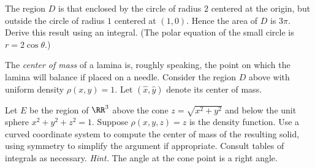 \documentclass[12pt]{exam}
\theoremstyle{definition}
\begin{document}
\begin{questions}

\question The region $D$ is that enclosed by the circle of radius $2$ centered at the origin, but outside the circle of radius $1$ centered at $(1,0)$. Hence the area of $D$ is $3\pi$. Derive this result using an integral. (The polar equation of the small circle is $r = 2\cos\theta$.)


\question The \emph{center of mass} of a lamina is, roughly speaking, the point on which the lamina will balance if placed on a needle. Consider the region $D$ above with uniform density $\rho(x,y) = 1$. Let $(\hat{x}, \hat{y})$ denote its center of mass.


\newpage

\question Let $E$ be the region of $\RR^3$ above the cone $z = \sqrt{x^2 + y^2}$ and below the unit sphere $x^2 + y^2 + z^2 = 1$. Suppose $\rho(x,y,z) = z$ is the density function. Use a curved coordinate system to compute the center of mass of the resulting solid, using symmetry to simplify the argument if appropriate. Consult tables of integrals as necessary. \emph{Hint.} The angle at the cone point is a right angle.


\end{questions} 
\end{document}
